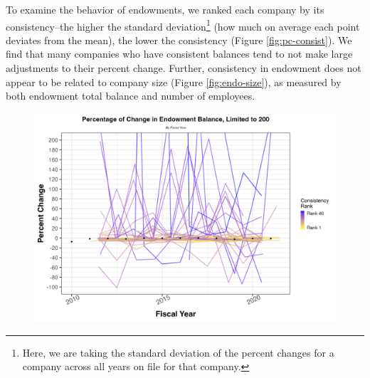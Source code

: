 \documentclass[Dance Data
Project,article,submit,moreauthors,pdftex]{mdpi}
\begin{document}
To examine the behavior of endowments, we ranked each company by its
consistency--the higher the standard deviation\footnote{Here, we are
  taking the standard deviation of the percent changes for a company
  across all years on file for that company.} (how much on average each
point deviates from the mean), the lower the consistency (Figure
\ref{fig:pc-consist}). We find that many companies who have consistent
balances tend to not make large adjustments to their percent change.
Further, consistency in endowment does not appear to be related to
company size (Figure \ref{fig:endo-size}), as measured by both endowment
total balance and number of employees.

\begin{figure}[H]
\includegraphics[width=0.9\linewidth,]{../images/pc_consist} \caption{\label{fig:pc-consist}}\label{fig:unnamed-chunk-9}
\end{figure}
\end{document}
